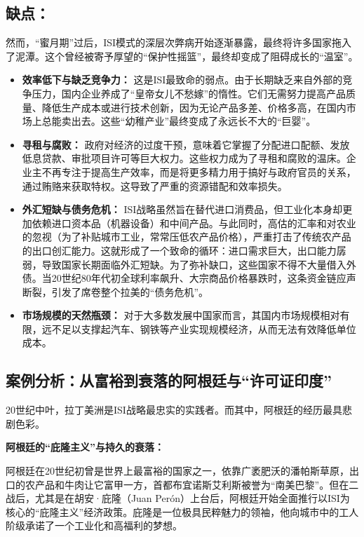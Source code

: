 \subsection{缺点：}

然而，“蜜月期”过后，ISI模式的深层次弊病开始逐渐暴露，最终将许多国家拖入了泥潭。这个曾经被寄予厚望的“保护性摇篮”，最终却变成了阻碍成长的“温室”。

\begin{itemize}
    \item \textbf{效率低下与缺乏竞争力：} 这是ISI最致命的弱点。由于长期缺乏来自外部的竞争压力，国内企业养成了“皇帝女儿不愁嫁”的惰性。它们无需努力提高产品质量、降低生产成本或进行技术创新，因为无论产品多差、价格多高，在国内市场上总能卖出去。这些“幼稚产业”最终变成了永远长不大的“巨婴”。
    \item \textbf{寻租与腐败：} 政府对经济的过度干预，意味着它掌握了分配进口配额、发放低息贷款、审批项目许可等巨大权力。这些权力成为了寻租和腐败的温床。企业主不再专注于提高生产效率，而是将更多精力用于搞好与政府官员的关系，通过贿赂来获取特权。这导致了严重的资源错配和效率损失。
    \item \textbf{外汇短缺与债务危机：} ISI战略虽然旨在替代进口消费品，但工业化本身却更加依赖进口资本品（机器设备）和中间产品。与此同时，高估的汇率和对农业的忽视（为了补贴城市工业，常常压低农产品价格），严重打击了传统农产品的出口创汇能力。这就形成了一个致命的循环：进口需求巨大，出口能力孱弱，导致国家长期面临外汇短缺。为了弥补缺口，这些国家不得不大量借入外债。当20世纪80年代初全球利率飙升、大宗商品价格暴跌时，这条资金链应声断裂，引发了席卷整个拉美的“债务危机”。
    \item \textbf{市场规模的天然瓶颈：} 对于大多数发展中国家而言，其国内市场规模相对有限，远不足以支撑起汽车、钢铁等产业实现规模经济，从而无法有效降低单位成本。
\end{itemize}

\subsection{案例分析：从富裕到衰落的阿根廷与“许可证印度”}

20世纪中叶，拉丁美洲是ISI战略最忠实的实践者。而其中，阿根廷的经历最具悲剧色彩。

\textbf{阿根廷的“庇隆主义”与持久的衰落：}

阿根廷在20世纪初曾是世界上最富裕的国家之一，依靠广袤肥沃的潘帕斯草原，出口的农产品和牛肉让它富甲一方，首都布宜诺斯艾利斯被誉为“南美巴黎”。但在二战后，尤其是在胡安·庇隆（Juan Perón）上台后，阿根廷开始全面推行以ISI为核心的“庇隆主义”经济政策。庇隆是一位极具民粹魅力的领袖，他向城市中的工人阶级承诺了一个工业化和高福利的梦想。

